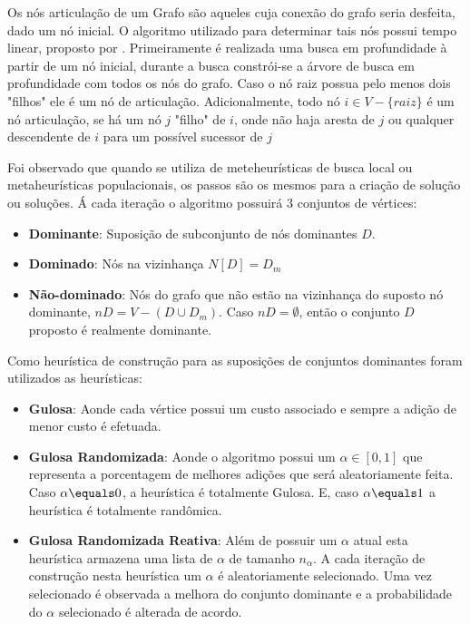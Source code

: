 \documentclass[conference,compsoc]{IEEEtran}
\begin{document}
Os nós articulação de um Grafo são aqueles cuja conexão do grafo seria desfeita, dado um nó inicial. O algoritmo utilizado para determinar tais nós possui tempo linear, proposto por \cite{Hopcroft}. Primeiramente é realizada uma busca em profundidade à partir de um nó inicial, durante a busca constrói-se a árvore de busca em profundidade com todos os nós do grafo. Caso o nó raiz possua pelo menos dois "filhos" ele é um nó de articulação. Adicionalmente, todo nó $i \in V - \{ raiz \}$ é um nó articulação, se há um nó $j$ "filho" de $i$, onde não haja aresta de $j$ ou qualquer descendente de $i$ para um possível sucessor de $j$

Foi observado que quando se utiliza de meteheurísticas de busca local ou metaheurísticas populacionais, os passos são os mesmos para a criação de solução ou soluções. Á cada iteração o algoritmo possuirá 3 conjuntos de vértices:

\begin{itemize}
    \item \textbf{Dominante}: Suposição de subconjunto de nós dominantes $D$.
    
    \item \textbf{Dominado}: Nós na vizinhança $N[D] = D_m$
    
    \item \textbf{Não-dominado}: Nós do grafo que não estão na vizinhança do suposto nó dominante, $nD = V - ( D \cup D_m )$. Caso $nD = \emptyset$, então o conjunto $D$ proposto é realmente dominante.
\end{itemize}


Como heurística de construção para as suposições de conjuntos dominantes foram utilizados as heurísticas:

\begin{itemize}
    \item \textbf{Gulosa}: Aonde cada vértice possui um custo associado e sempre a adição de menor custo é efetuada.
    
    \item \textbf{Gulosa Randomizada}: Aonde o algoritmo possui um $\alpha \in [0,1]$ que representa a porcentagem de melhores adições que será aleatoriamente feita. Caso $\alpha \equals 0$, a heurística é totalmente Gulosa. E, caso $\alpha \equals 1$ a heurística é totalmente randômica.
    
    \item \textbf{Gulosa Randomizada Reativa}: Além de possuir um $\alpha$ atual esta heurística armazena uma lista de $\alpha$ de tamanho $n_\alpha$. A cada iteração de construção nesta heurística um $\alpha$ é aleatoriamente selecionado. Uma vez selecionado é observada a melhora do conjunto dominante e a probabilidade do $\alpha$ selecionado é alterada de acordo.
\end{itemize}
\end{document}
